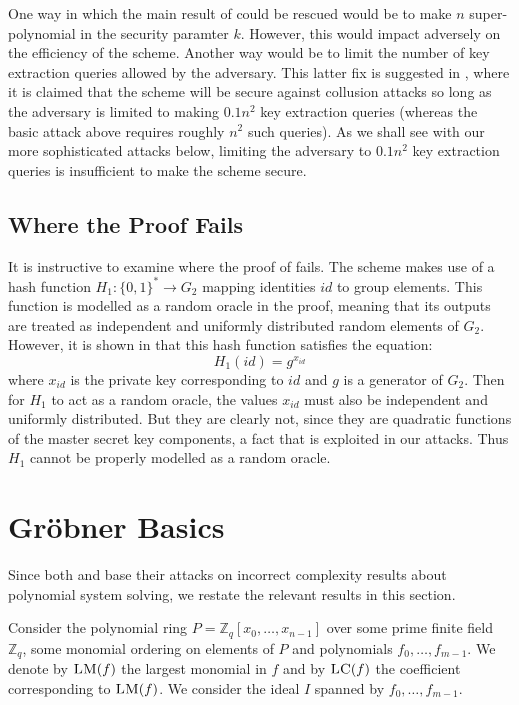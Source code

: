 \documentclass{llncs}
\newcommand{\ring}[1]{\mathbb{#1}}
\newcommand{\Z}{\ensuremath{\ring{Z}}\xspace}
\newcommand{\FX}{\ensuremath{\Z_q[x_0,\dots,x_{n-1}]}\xspace}
\newcommand{\sys}{\ensuremath{f_0,\dots,f_{m-1}}\xspace}
\newcommand{\LM}{\ensuremath{\textsc{LM}}\xspace}
\newcommand{\LC}{\ensuremath{\textsc{LC}}\xspace}
\begin{document}
One way in which the main result of \cite{CCGHC10} could be rescued would be to make $n$ super-polynomial in the security paramter $k$. However, this would impact adversely on the efficiency of the scheme. Another way would be to limit the number of key extraction queries allowed by the adversary. This latter fix is suggested in \cite[Section 3.1]{CCGHC10}, where it is claimed that the scheme will be secure against collusion attacks so long as the adversary is limited to making $0.1n^2$ key extraction queries (whereas the basic attack above requires roughly $n^2$ such queries). As we shall see with our more sophisticated attacks below, limiting the adversary to $0.1n^2$ key extraction queries is insufficient to make the scheme secure.

\subsection{Where the Proof Fails}
It is instructive to examine where the proof of \cite[Theorem 3.1]{CCGHC10} fails. The scheme makes use of a hash function $H_1: \{0,1\}^* \rightarrow G_2$ mapping identities $id$ to group elements. This function is modelled as a random oracle in the proof, meaning that its outputs are treated as independent and uniformly distributed random elements of $G_2$. However, it is shown in \cite{CCGHC10} that this hash function satisfies the equation:
\[
H_1(id) =g^{x_{id}}
\]
where $x_{id}$ is the private key corresponding to $id$ and $g$ is a generator of $G_2$. Then for $H_1$ to act as a random oracle, the values $x_{id}$ must also be independent and uniformly distributed. But they are clearly not, since they are quadratic functions of the master secret key components, a fact that is exploited in our attacks. Thus $H_1$ cannot be properly modelled as a random oracle.

\section{Gr\"{o}bner Basics}\label{sec-gb}

Since both \cite{CCGHC10} and \cite{susilo-baek:asiaccs2011} base their attacks on incorrect complexity results about polynomial system solving, we restate the relevant results in this section.

Consider the polynomial ring $P = \FX$ over some prime finite field $\Z_q$, some monomial ordering on elements of $P$ and polynomials \sys. We denote by $\LM(f)$ the largest monomial in $f$ and by $\LC(f)$ the coefficient corresponding to $\LM(f)$. We consider the ideal $I$ spanned by \sys.
\end{document}
